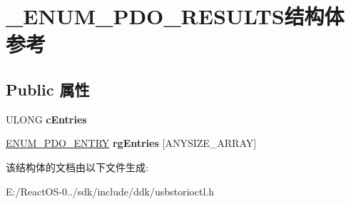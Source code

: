 \hypertarget{struct___e_n_u_m___p_d_o___r_e_s_u_l_t_s}{}\section{\+\_\+\+E\+N\+U\+M\+\_\+\+P\+D\+O\+\_\+\+R\+E\+S\+U\+L\+T\+S结构体 参考}
\label{struct___e_n_u_m___p_d_o___r_e_s_u_l_t_s}
\subsection*{Public 属性}
\begin{DoxyCompactItemize}
\item 
\mbox{\label{struct___e_n_u_m___p_d_o___r_e_s_u_l_t_s_a8b05c4fff8f9af5074e7c7fc93513223}} 
U\+L\+O\+NG {\bfseries c\+Entries}
\item 
\mbox{\label{struct___e_n_u_m___p_d_o___r_e_s_u_l_t_s_a551bdee889b4295988ca18d853b71e3a}} 
\hyperlink{struct___e_n_u_m___p_d_o___e_n_t_r_y}{E\+N\+U\+M\+\_\+\+P\+D\+O\+\_\+\+E\+N\+T\+RY} {\bfseries rg\+Entries} \mbox{[}A\+N\+Y\+S\+I\+Z\+E\+\_\+\+A\+R\+R\+AY\mbox{]}
\end{DoxyCompactItemize}


该结构体的文档由以下文件生成\+:\begin{DoxyCompactItemize}
\item 
E\+:/\+React\+O\+S-\/0../sdk/include/ddk/usbstorioctl.\+h\end{DoxyCompactItemize}
